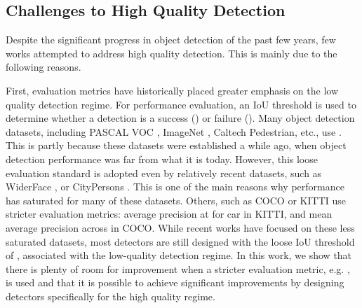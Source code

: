 \documentclass[10pt,journal,compsoc]{IEEEtran}
\begin{document}
\subsection{Challenges to High Quality Detection}
\label{subsec:high quality}

Despite the significant progress in object detection of the past few years,
few works attempted to address high quality detection. This is mainly due to
the following reasons.

First, evaluation metrics have historically placed greater emphasis on the
low quality detection regime. For performance evaluation, an IoU threshold
 is used to determine whether a detection is a
success () or failure
(). Many object detection datasets, including
PASCAL VOC \cite{DBLP:journals/ijcv/EveringhamGWWZ10},
ImageNet \cite{DBLP:journals/ijcv/RussakovskyDSKS15},
Caltech Pedestrian\cite{DBLP:journals/pami/DollarWSP12}, etc., use .
This is partly because these datasets were established a while ago, when
object detection performance was far from what it is today. However,
this loose evaluation standard is adopted even by relatively recent datasets,
such as WiderFace \cite{DBLP:conf/cvpr/YangLLT16}, or
CityPersons \cite{DBLP:conf/cvpr/ZhangBS17}. This is one of the main reasons
why performance has saturated for many of these datasets. Others,
such as COCO \cite{DBLP:conf/eccv/LinMBHPRDZ14} or
KITTI \cite{DBLP:conf/cvpr/GeigerLU12} use stricter evaluation metrics:
average precision at  for car in KITTI, and mean average precision
across  in COCO. While recent works have
focused on these less saturated datasets, most detectors are still designed
with the loose IoU threshold of , associated with the low-quality
detection regime. In this work, we show that there is plenty of
room for improvement when a stricter evaluation metric, e.g. , is
used and that it is possible to achieve significant improvements by
designing detectors specifically for the high quality regime.
\end{document}
